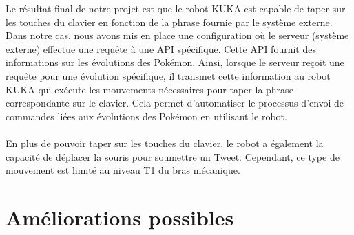 \documentclass[twoside]{article}
\begin{document}
\begin{multicols}{2}
Le résultat final de notre projet est que le robot KUKA est capable de taper sur les touches du clavier en fonction de la phrase fournie par le système externe.
Dans notre cas, nous avons mis en place une configuration où le serveur (système externe) effectue une requête à une API spécifique.
Cette API fournit des informations sur les évolutions des Pokémon.
Ainsi, lorsque le serveur reçoit une requête pour une évolution spécifique, il transmet cette information au robot KUKA qui exécute les mouvements nécessaires pour taper la phrase correspondante sur le clavier.
Cela permet d'automatiser le processus d'envoi de commandes liées aux évolutions des Pokémon en utilisant le robot.
\\
\\
En plus de pouvoir taper sur les touches du clavier, le robot a également la capacité de déplacer la souris pour soumettre un Tweet.
Cependant, ce type de mouvement est limité au niveau T1 du bras mécanique.

\section{Améliorations possibles}


\end{multicols}
\end{document}
